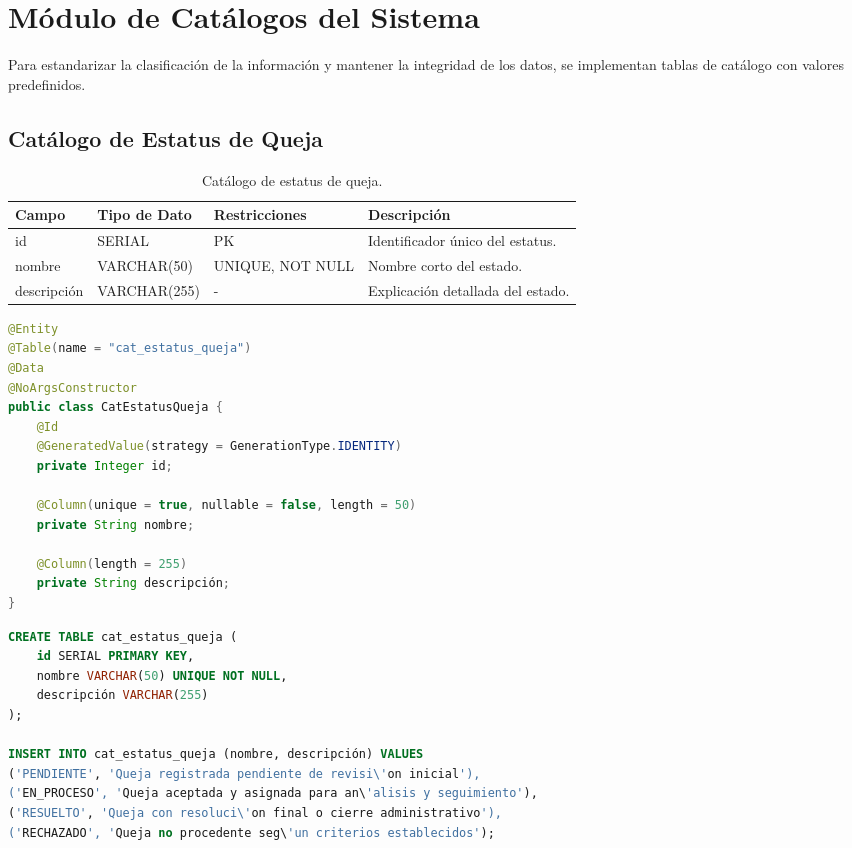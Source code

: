\section{M\'odulo de Cat\'alogos del Sistema}
Para estandarizar la clasificaci\'on de la informaci\'on y mantener la integridad de los datos, se implementan tablas de cat\'alogo con valores predefinidos.

\subsection{Cat\'alogo de Estatus de Queja}

\begin{table}[H]
\centering
\small
\begin{tabularx}{\textwidth}{|l|l|l|X|}
\hline
\rowcolor{azulESCOM} 
\color{white}\textbf{Campo} & \color{white}\textbf{Tipo de Dato} & \color{white}\textbf{Restricciones} & \color{white}\textbf{Descripci\'on} \\ \hline
id & SERIAL & PK & Identificador \'unico del estatus. \\ \hline
nombre & VARCHAR(50) & UNIQUE, NOT NULL & Nombre corto del estado. \\ \hline
descripción & VARCHAR(255) & - & Explicaci\'on detallada del estado. \\ \hline
\end{tabularx}
\caption{Cat\'alogo de estatus de queja.}
\label{tab:dict_cat_estatus}
\end{table}

\begin{lstlisting}[language=Java, caption={Entidad Java para cat\'alogo de estatus.}, label={lst:java_cat_estatus}]
@Entity
@Table(name = "cat_estatus_queja")
@Data
@NoArgsConstructor
public class CatEstatusQueja {
    @Id
    @GeneratedValue(strategy = GenerationType.IDENTITY)
    private Integer id;
    
    @Column(unique = true, nullable = false, length = 50)
    private String nombre;
    
    @Column(length = 255)
    private String descripción;
}
\end{lstlisting}

\begin{lstlisting}[language=SQL, caption={Script de creaci\'on e inicializaci\'on del cat\'alogo de estatus.}, label={lst:sql_cat_estatus}]
CREATE TABLE cat_estatus_queja (
    id SERIAL PRIMARY KEY,
    nombre VARCHAR(50) UNIQUE NOT NULL,
    descripción VARCHAR(255)
);

INSERT INTO cat_estatus_queja (nombre, descripción) VALUES 
('PENDIENTE', 'Queja registrada pendiente de revisi\'on inicial'),
('EN_PROCESO', 'Queja aceptada y asignada para an\'alisis y seguimiento'),
('RESUELTO', 'Queja con resoluci\'on final o cierre administrativo'),
('RECHAZADO', 'Queja no procedente seg\'un criterios establecidos');
\end{lstlisting}

